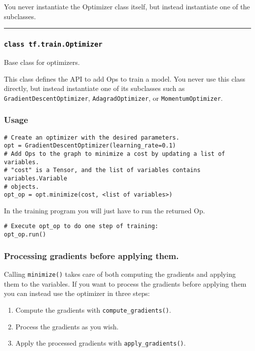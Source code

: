 You never instantiate the Optimizer class itself, but instead
instantiate one of the subclasses.

\begin{center}\rule{0.5\linewidth}{\linethickness}\end{center}

\subsubsection{\texorpdfstring{\texttt{class\ tf.train.Optimizer}
}{class tf.train.Optimizer }}\label{class-tf.train.optimizer}

Base class for optimizers.

This class defines the API to add Ops to train a model. You never use
this class directly, but instead instantiate one of its subclasses such
as \texttt{GradientDescentOptimizer}, \texttt{AdagradOptimizer}, or
\texttt{MomentumOptimizer}.

\subsubsection{Usage }\label{usage}

\begin{verbatim}
# Create an optimizer with the desired parameters.
opt = GradientDescentOptimizer(learning_rate=0.1)
# Add Ops to the graph to minimize a cost by updating a list of variables.
# "cost" is a Tensor, and the list of variables contains variables.Variable
# objects.
opt_op = opt.minimize(cost, <list of variables>)
\end{verbatim}

In the training program you will just have to run the returned Op.

\begin{verbatim}
# Execute opt_op to do one step of training:
opt_op.run()
\end{verbatim}

\subsubsection{Processing gradients before applying them.
}\label{processing-gradients-before-applying-them.}

Calling \texttt{minimize()} takes care of both computing the gradients
and applying them to the variables. If you want to process the gradients
before applying them you can instead use the optimizer in three steps:

\begin{enumerate}
\def\labelenumi{\arabic{enumi}.}
\tightlist
\item
  Compute the gradients with \texttt{compute\_gradients()}.
\item
  Process the gradients as you wish.
\item
  Apply the processed gradients with \texttt{apply\_gradients()}.
\end{enumerate}

